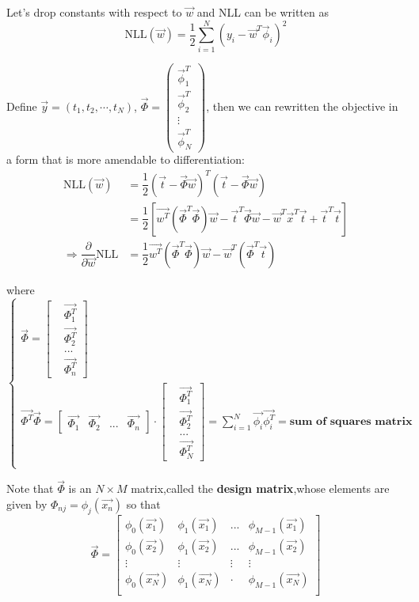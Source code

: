 Let's drop constants with respect to $\vec{w}$ and NLL can be written as
\begin{equation}
\text{NLL}(\vec{w}) = \dfrac{1}{2}\sum\limits_{i=1}^N (y_i-\vec{w}^T\vec{\phi}_i)^2
\end{equation}

Define $\vec{y}=(t_1,t_2,\cdots,t_N)$, $\vec{\Phi}=\left(\begin{array}{c}\vec{\phi}_1^T \\ \vec{\phi}_2^T \\ \vdots \\ \vec{\phi}_N^T\end{array}\right)$, then we can rewritten the objective in a form that is more amendable to differentiation:
\begin{align}
\text{NLL}(\vec{w}) &= \dfrac{1}{2}(\vec{t}-\vec{\Phi}\vec{w})^T(\vec{t}-\vec{\Phi}\vec{w})\\
&= \dfrac{1}{2} [\vec{w^T} (\vec{\Phi}^T\vec{\Phi})\vec{w} - \vec{t}^T\vec{\Phi}\vec{w}- \vec{w}^T\vec{x}^T\vec{t}  +\vec{t}^T\vec{t}]			\\
\Rightarrow
\dfrac{\partial}{\partial \vec{w}}\text{NLL} &= \dfrac{1}{2} \vec{w^T} (\vec{\Phi}^T\vec{\Phi})\vec{w} -\vec{w}^T(\vec{\Phi}^T\vec{t}) 
\end{align}

where
$\begin{cases}
\vec{\Phi} = \begin{bmatrix}
&\vec{\Phi_1^T} \\
&\vec{\Phi_2^T} \\
& ... \\
&\vec{\Phi_n^T}
\end{bmatrix} \\	
\vec{\Phi^T}\vec{\Phi} =
\begin{bmatrix}
\vec{\Phi_1} & \vec{\Phi_2} & ...&\vec{\Phi_n}
\end{bmatrix} 
\cdot
\begin{bmatrix}
&\vec{\Phi_1^T} \\
&\vec{\Phi_2^T} \\
& ... \\
&\vec{\Phi_N^T}
\end{bmatrix}  = \sum\limits_{i=1}^{N}\vec{\phi_i}\vec{\phi_i^T} = \textbf{sum of squares matrix} \\
\end{cases}$

Note that $\vec{\Phi}$ is an $N\times M$ matrix,called the \textbf{design matrix},whose elements are given by $\Phi_{nj}=\phi_j(\vec{x_n})$ so that
\begin{equation}
\vec{\Phi}=
\begin{bmatrix}
\phi_0(\vec{x_1}) &	\phi_1(\vec{x_1}) &...&\phi_{M-1}(\vec{x_1}) \\
\phi_0(\vec{x_2}) & \phi_1(\vec{x_2}) &...&\phi_{M-1}(\vec{x_2}) \\
\vdots &\vdots &\vdots&\vdots \\
\phi_0(\vec{x_N})& \phi_1(\vec{x_{N}})& \cdot &\phi_{M-1}(\vec{x_N})\\
\end{bmatrix}
\end{equation}



